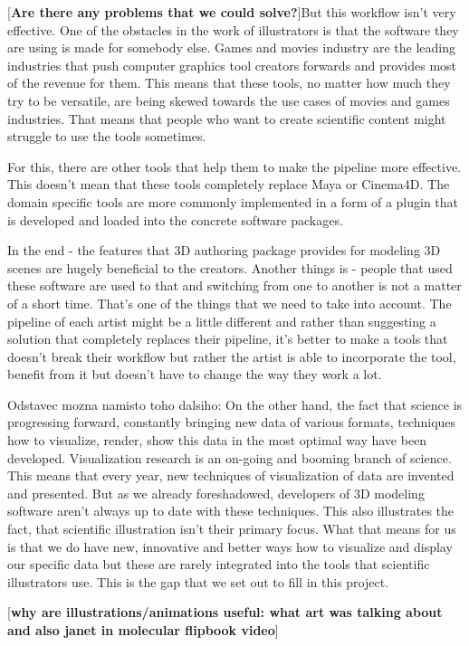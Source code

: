 \documentclass[
  digital, %
  table,   %
  nolof,     %
  nolot,     %
]{fithesis3}
\begin{document}
[\textbf{Are there any problems that we could solve?}]But this workflow isn't very effective. One of the obstacles in the work of illustrators is that the software they are using is made for somebody else. Games and movies industry are the leading industries that push computer graphics tool creators forwards and provides most of the revenue for them. This means that these tools, no matter how much they try to be versatile, are being skewed towards the use cases of movies and games industries. That means that people who want to create scientific content might struggle to use the tools sometimes.

For this, there are other tools that help them to make the pipeline more effective. This doesn't mean that these tools completely replace Maya or Cinema4D. The domain specific tools are more commonly implemented in a form of a plugin that is developed and loaded into the concrete software packages.

In the end - the features that 3D authoring package provides for modeling 3D scenes are hugely beneficial to the creators. Another things is - people that used these software are used to that and switching from one to another is not a matter of a short time. That's one of the things that we need to take into account. The pipeline of each artist might be a little different and rather than suggesting a solution that completely replaces their pipeline, it's better to make a tools that doesn't break their workflow but rather the artist is able to incorporate the tool, benefit from it but doesn't have to change the way they work a lot.

Odstavec mozna namisto toho dalsiho: On the other hand, the fact that science is progressing forward, constantly bringing new data of various formats, techniques how to visualize, render, show this data in the most optimal way have been developed. Visualization research is an on-going and booming branch of science. This means that every year, new techniques of visualization of data are invented and presented. But as we already foreshadowed, developers of 3D modeling software aren't always up to date with these techniques. This also illustrates the fact, that scientific illustration isn't their primary focus. What that means for us is that we do have new, innovative and better ways how to visualize and display our specific data but these are rarely integrated into the tools that scientific illustrators use. This is the gap that we set out to fill in this project.

[\textbf{why are illustrations/animations useful: what art was talking about and also janet in molecular flipbook video}]
\end{document}
